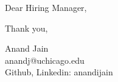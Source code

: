 \documentclass[11pt,a4paper]{letter} %
\begin{document}
Dear Hiring Manager,

Thank you, 

Anand Jain\\
anandj@uchicago.edu\\
Github, Linkedin: anandijain
\end{document}
